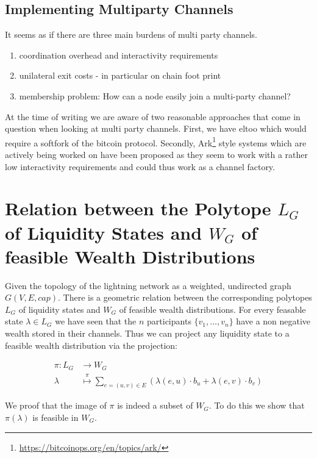 \documentclass[10pt,twocolumn]{article}
\begin{document}
\subsection{Implementing Multiparty Channels}
It seems as if there are three main burdens of multi party channels.
\begin{enumerate}
\item coordination overhead and interactivity requirements
\item unilateral exit costs - in particular on chain foot print
  \item membership problem: How can a node easily join a multi-party channel?
\end{enumerate}
At the time of writing we are aware of two reasonable approaches that come in question when looking at multi party channels. First, we have eltoo \cite{decker2018eltoo} which would require a softfork of the bitcoin protocol. Secondly, Ark\footnote{\url{https://bitcoinops.org/en/topics/ark/}} style systems which are actively being worked on have been proposed as they seem to work with a rather low interactivity requirements\cite{Pickhardt2025} and could thus work as a channel factory\cite{burchert2018scalable}. 

\section{Relation between the Polytope $L_G$ of Liquidity States and $W_G$ of feasible Wealth Distributions}
Given the topology of the lightning network as a weighted, undirected graph $G(V,E,cap)$.
There is a geometric relation between the corresponding polytopes $L_G$ of liquidity states and $W_G$ of feasible wealth distributions.
For every feasable state $\lambda \in L_G$ we have seen that the $n$ participants $\{v_1,\dots,v_n\}$ have a non negative wealth stored in their channels.
Thus we can project any liquidity state to a feasible wealth distribution via the projection:

\begin{equation}
  \begin{split}
  \label{eq:pi}
  \pi: L_G & \longrightarrow {W_G}\\
  \lambda & \stackrel{\pi}{\longmapsto}\sum_{e=(u,v)\in E}\left(\lambda(e,u)\cdot b_u + \lambda(e,v)\cdot b_v\right)
  \end{split}
\end{equation}

We proof that the image of $\pi$ is indeed a subset of $W_G$. To do this we show that $\pi(\lambda)$ is feasible in $W_G$.
\end{document}
